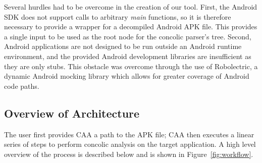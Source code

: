 \documentclass{sig-alternate}
\begin{document}
Several hurdles had to be overcome in the creation of our tool. First, the Android SDK does not support calls to arbitrary \emph{main} functions, so it is therefore necessary to provide a wrapper for a decompiled Android APK file. This provides a single input to be used as the root node for the concolic parser's tree. Second, Android applications are not designed to be run outside an Android runtime environment, and the provided Android development libraries are insufficient as they are only stubs. This obstacle was overcome through the use of Robolectric, a dynamic Android mocking library which allows for greater coverage of Android code paths.

\subsection{Overview of Architecture}
The user first provides CAA a path to the APK file; CAA then executes a linear series of steps to perform concolic analysis on the target application. A high level overview of the process is described below and is shown in Figure~\ref{fig:workflow}.
\end{document}
